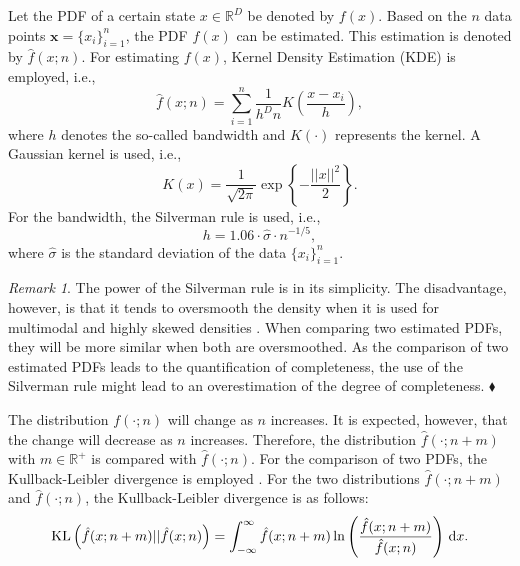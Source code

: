 \documentclass[10pt,final,a4paper,oneside,onecolumn]{article}
\newcommand*{\ud}{\mathrm{\,d}}                                 %
\newcommand{\kl}[2]{\textup{KL} \left( #1 || #2 \right)}
\theoremstyle{plain}\newtheorem{definition}{Definition}[section]    %
\theoremstyle{definition}\newtheorem{example}{Example}[section]     %
\theoremstyle{remark}\newtheorem{remarkenv}{Remark}[section]        %
\newenvironment{remark}{\begin{remarkenv}}%
                       {\hfill$\blacklozenge$\end{remarkenv}}       %
\begin{document}
Let the PDF of a certain state $x \in \mathds{R}^D$ be denoted by $f(x)$. Based on the $n$ data points $\textbf{x}=\{x_i\}_{i=1}^n$, the PDF $f(x)$ can be estimated. This estimation is denoted by $\hat{f}(x;n)$. For estimating $f(x)$, Kernel Density Estimation (KDE) \cite{rosenblatt1956remarks, parzen1962estimation} is employed, i.e.,
\begin{equation} \label{eq:kde}
	\hat{f}(x;n) = \sum_{i=1}^n \frac{1}{h^D n} K \left( \frac{x - x_i}{h} \right),
\end{equation}
where $h$ denotes the so-called bandwidth and $K(\cdot)$ represents the kernel. A Gaussian kernel is used, i.e.,
\begin{equation}
	K(x) = \frac{1}{\sqrt{2\pi}} \exp \left\{ -\frac{||x||^2}{2}\right\}.
\end{equation}
For the bandwidth, the Silverman rule \cite{silverman1986density} is used, i.e., 
\begin{equation} \label{eq:silverman}
	h=1.06\cdot\hat{\sigma}\cdot n^{-1/5},
\end{equation}
where $\hat{\sigma}$ is the standard deviation of the data $\{x_i\}_{i=1}^n$.

\begin{remark}
	The power of the Silverman rule is in its simplicity. The disadvantage, however, is that it tends to oversmooth the density when it is used for multimodal and highly skewed densities \cite{silverman1986density}. When comparing two estimated PDFs, they will be more similar when both are oversmoothed. As the comparison of two estimated PDFs leads to the quantification of completeness, the use of the Silverman rule might lead to an overestimation of the degree of completeness.
\end{remark}

The distribution $f(\cdot;n)$ will change as $n$ increases. It is expected, however, that the change will decrease as $n$ increases. Therefore, the distribution $\hat{f}(\cdot;n+m)$ with $m \in \mathds{R}^+$ is compared with $\hat{f}(\cdot;n)$. For the comparison of two PDFs, the Kullback-Leibler divergence is employed \cite{kullback1951, bishop2006pattern}. For the two distributions $\hat{f}(\cdot;n+m)$ and $\hat{f}(\cdot;n)$, the Kullback-Leibler divergence is as follows:
\begin{equation} \label{eq:KL divergence}
	\kl{\hat{f}(x;n+m)}{\hat{f}(x;n)} = \int_{-\infty}^{\infty} \hat{f}(x;n+m) \ln \left( \frac{\hat{f}(x;n+m)}{\hat{f}(x;n)} \right) \ud x.
\end{equation}
\end{document}
